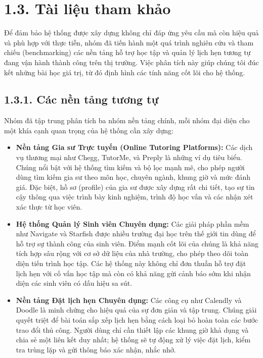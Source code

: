 
\section*{1.3. Tài liệu tham khảo}
Để đảm bảo hệ thống được xây dựng không chỉ đáp ứng yêu cầu mà còn hiệu quả và phù hợp với thực tiễn, nhóm đã tiến hành một quá trình nghiên cứu và tham chiếu (benchmarking) các nền tảng hỗ trợ học tập và quản lý lịch hẹn tương tự đang vận hành thành công trên thị trường. Việc phân tích này giúp chúng tôi đúc kết những bài học giá trị, từ đó định hình các tính năng cốt lõi cho hệ thống.


\subsection*{1.3.1. Các nền tảng tương tự}
Nhóm đã tập trung phân tích ba nhóm nền tảng chính, mỗi nhóm đại diện cho một khía cạnh quan trọng của hệ thống cần xây dựng:

\begin{itemize}
    \item \textbf{Nền tảng Gia sư Trực tuyến (Online Tutoring Platforms):} Các dịch vụ thương mại như Chegg, TutorMe, và Preply là những ví dụ tiêu biểu. Chúng nổi bật với hệ thống tìm kiếm và bộ lọc mạnh mẽ, cho phép người dùng tìm kiếm gia sư theo môn học, chuyên ngành, khung giờ và mức đánh giá. Đặc biệt, hồ sơ (profile) của gia sư được xây dựng rất chi tiết, tạo sự tin cậy thông qua việc trình bày kinh nghiệm, trình độ học vấn và các nhận xét xác thực từ học viên.
    \item \textbf{Hệ thống Quản lý Sinh viên Chuyên dụng:} Các giải pháp phần mềm như Navigate và Starfish được nhiều trường đại học trên thế giới tin dùng để hỗ trợ sự thành công của sinh viên. Điểm mạnh cốt lõi của chúng là khả năng tích hợp sâu rộng với cơ sở dữ liệu của nhà trường, cho phép theo dõi toàn diện tiến trình học tập. Các hệ thống này không chỉ đơn thuần hỗ trợ đặt lịch hẹn với cố vấn học tập mà còn có khả năng gửi cảnh báo sớm khi nhận diện các sinh viên có dấu hiệu sa sút.
    \item \textbf{Nền tảng Đặt lịch hẹn Chuyên dụng:} Các công cụ như Calendly và Doodle là minh chứng cho hiệu quả của sự đơn giản và tập trung. Chúng giải quyết triệt để bài toán sắp xếp lịch hẹn bằng cách loại bỏ hoàn toàn các bước trao đổi thủ công. Người dùng chỉ cần thiết lập các khung giờ khả dụng và chia sẻ một liên kết duy nhất; hệ thống sẽ tự động xử lý việc đặt lịch, kiểm tra trùng lặp và gửi thông báo xác nhận, nhắc nhở.

\end{itemize}

